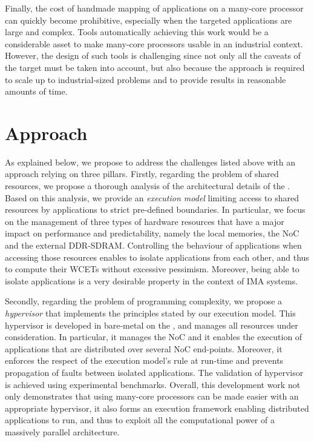 \documentclass[main.tex]{subfiles}
\begin{document}
Finally, the cost of handmade mapping of applications on a many-core processor can quickly become prohibitive, especially when the targeted applications are large and complex. Tools automatically achieving this work would be a considerable asset to make many-core processors usable in an industrial context. However, the design of such tools is challenging since not only all the caveats of the target must be taken into account, but also because the approach is required to scale up to industrial-sized problems and to provide results in reasonable amounts of time.\\


\section{Approach}
As explained below, we propose to address the challenges listed above with an approach relying on three pillars. Firstly, regarding the problem of shared resources, we propose a thorough analysis of the architectural details of the \mppalong. Based on this analysis, we provide an \emph{execution model} limiting access to shared resources by applications to strict pre-defined boundaries. In particular, we focus on the management of three types of hardware resources that have a major impact on performance and predictability, namely the local memories, the NoC and the external DDR-SDRAM. Controlling the behaviour of applications when accessing those resources enables to isolate applications from each other, and thus to compute their WCETs without excessive pessimism. Moreover, being able to isolate applications is a very desirable property in the context of IMA systems.

Secondly, regarding the problem of programming complexity, we propose a \emph{hypervisor} that implements the principles stated by our execution model. This hypervisor is developed in bare-metal on the \mppalong, and manages all resources under consideration. In particular, it manages the NoC and it enables the execution of applications that are distributed over several NoC end-points. Moreover, it enforces the respect of the execution model's rule at run-time and prevents propagation of faults between isolated applications. The validation of hypervisor is achieved using experimental benchmarks. Overall, this development work not only demonstrates that using many-core processors can be made easier with an appropriate hypervisor, it also forms an execution framework enabling distributed applications to run, and thus to exploit all the computational power of a massively parallel architecture.
\end{document}

